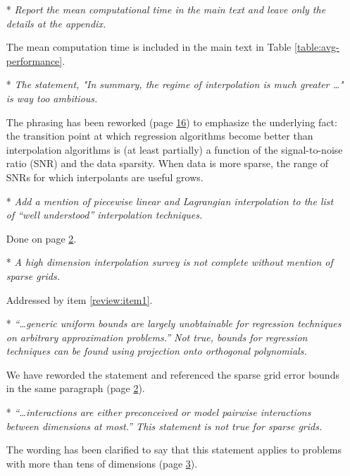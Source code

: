 \begin{itemize}[leftmargin=.5cm]
\item[*] {\it Report the mean computational time in the main text and leave only the details at the appendix.}\vspace{.2cm}

The mean computation time is included in the main text in Table \ref{table:avg-performance}.

\item[*] {\it The statement, "In summary, the regime of interpolation is much greater \ldots" is way too ambitious.}\vspace{.2cm}

The phrasing has been reworked (page \hyperlink{page.16}{16}) to emphasize the underlying fact: the transition point at which regression algorithms become better than interpolation algorithms is (at least partially) a function of the signal-to-noise ratio (SNR) and the data sparsity. When data is more sparse, the range of SNRs for which interpolants are useful grows.

\item[*] {\it Add a mention of piecewise linear and Lagrangian interpolation to the list of ``well understood'' interpolation techniques.}\vspace{.2cm}

Done on page \hyperlink{page.2}{2}.

\item[*] {\it A high dimension interpolation survey is not complete without mention of sparse grids.}\vspace{.2cm}

Addressed by item \ref{review:item1}.

\newpage\setcounter{page}{0}\thispagestyle{empty}
\item[*] {\it ``\ldots generic uniform bounds are largely unobtainable for regression techniques on arbitrary approximation problems.'' Not true, bounds for regression techniques can be found using projection onto orthogonal polynomials.}\vspace{.2cm}

We have reworded the statement and referenced the sparse grid error bounds in the same paragraph (page \hyperlink{page.2}{2}).

\item[*] {\it ``\ldots interactions are either preconceived or model pairwise interactions between dimensions at most.'' This statement is not true for sparse grids.}\vspace{.2cm}

The wording has been clarified to say that this statement applies to problems with more than tens of dimensions (page \hyperlink{page.3}{3}).


\end{itemize}
